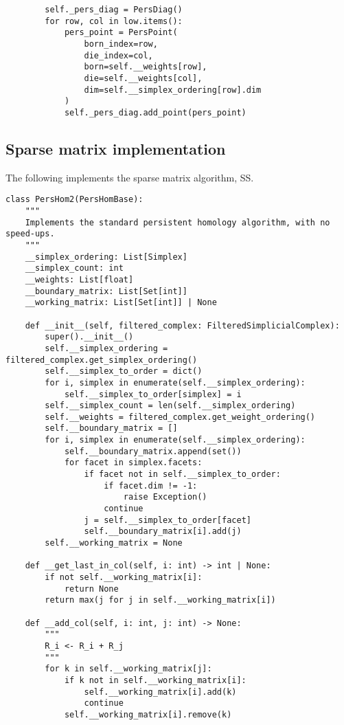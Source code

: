 \begin{verbatim}
        self._pers_diag = PersDiag()
        for row, col in low.items():
            pers_point = PersPoint(
                born_index=row,
                die_index=col,
                born=self.__weights[row],
                die=self.__weights[col],
                dim=self.__simplex_ordering[row].dim
            )
            self._pers_diag.add_point(pers_point)

\end{verbatim}

\subsection{Sparse matrix implementation}

The following implements the sparse matrix algorithm, \textsc{SS}.

\begin{verbatim}
class PersHom2(PersHomBase):
    """
    Implements the standard persistent homology algorithm, with no speed-ups.
    """
    __simplex_ordering: List[Simplex]
    __simplex_count: int
    __weights: List[float]
    __boundary_matrix: List[Set[int]]
    __working_matrix: List[Set[int]] | None

    def __init__(self, filtered_complex: FilteredSimplicialComplex):
        super().__init__()
        self.__simplex_ordering = filtered_complex.get_simplex_ordering()
        self.__simplex_to_order = dict()
        for i, simplex in enumerate(self.__simplex_ordering):
            self.__simplex_to_order[simplex] = i
        self.__simplex_count = len(self.__simplex_ordering)
        self.__weights = filtered_complex.get_weight_ordering()
        self.__boundary_matrix = []
        for i, simplex in enumerate(self.__simplex_ordering):
            self.__boundary_matrix.append(set())
            for facet in simplex.facets:
                if facet not in self.__simplex_to_order:
                    if facet.dim != -1:
                        raise Exception()
                    continue
                j = self.__simplex_to_order[facet]
                self.__boundary_matrix[i].add(j)
        self.__working_matrix = None

    def __get_last_in_col(self, i: int) -> int | None:
        if not self.__working_matrix[i]:
            return None
        return max(j for j in self.__working_matrix[i])

    def __add_col(self, i: int, j: int) -> None:
        """
        R_i <- R_i + R_j
        """
        for k in self.__working_matrix[j]:
            if k not in self.__working_matrix[i]:
                self.__working_matrix[i].add(k)
                continue
            self.__working_matrix[i].remove(k)


\end{verbatim}
